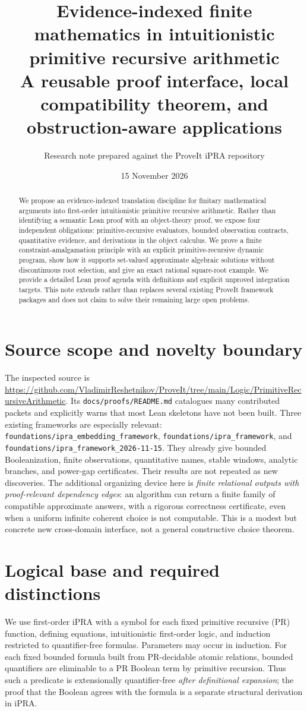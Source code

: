 \documentclass[11pt]{article}
\title{Evidence-indexed finite mathematics in intuitionistic primitive recursive arithmetic\\\large A reusable proof interface, local compatibility theorem, and obstruction-aware applications}
\author{Research note prepared against the ProveIt iPRA repository}\date{15 November 2026}
\begin{document}
\maketitle
\begin{abstract}
We propose an evidence-indexed translation discipline for finitary mathematical arguments into first-order intuitionistic primitive recursive arithmetic. Rather than identifying a semantic Lean proof with an object-theory proof, we expose four independent obligations: primitive-recursive evaluators, bounded observation contracts, quantitative evidence, and derivations in the object calculus. We prove a finite constraint-amalgamation principle with an explicit primitive-recursive dynamic program, show how it supports set-valued approximate algebraic solutions without discontinuous root selection, and give an exact rational square-root example. We provide a detailed Lean proof agenda with definitions and explicit unproved integration targets. This note extends rather than replaces several existing ProveIt framework packages and does not claim to solve their remaining large open problems.
\end{abstract}
\tableofcontents
\section{Source scope and novelty boundary}
The inspected source is \url{https://github.com/VladimirReshetnikov/ProveIt/tree/main/Logic/PrimitiveRecursiveArithmetic}. Its \texttt{docs/proofs/README.md} catalogues many contributed packets and explicitly warns that most Lean skeletons have not been built. Three existing frameworks are especially relevant: \texttt{foundations/ipra\_embedding\_framework}, \texttt{foundations/ipra\_framework}, and \texttt{foundations/ipra\_framework\_2026-11-15}. They already give bounded Booleanization, finite observations, quantitative names, stable windows, analytic branches, and power-gap certificates. Their results are not repeated as new discoveries. The additional organizing device here is \emph{finite relational outputs with proof-relevant dependency edges}: an algorithm can return a finite family of compatible approximate answers, with a rigorous correctness certificate, even when a uniform infinite coherent choice is not computable. This is a modest but concrete new cross-domain interface, not a general constructive choice theorem.

\section{Logical base and required distinctions}
We use first-order iPRA with a symbol for each fixed primitive recursive (PR) function, defining equations, intuitionistic first-order logic, and induction restricted to quantifier-free formulas. Parameters may occur in induction. For each fixed bounded formula built from PR-decidable atomic relations, bounded quantifiers are eliminable to a PR Boolean term by primitive recursion. Thus such a predicate is extensionally quantifier-free \emph{after definitional expansion}; the proof that the Boolean agrees with the formula is a separate structural derivation in iPRA.
\end{document}
